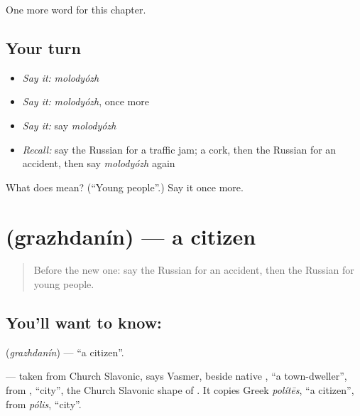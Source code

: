 \begin{grammarlens}[title={What you've built}]
One more word for this chapter.
\end{grammarlens}

\subsection*{Your turn}
\begin{itemize}
\raggedright
  \item \emph{Say it:} \emph{molodyózh}
  \item \emph{Say it:} \emph{molodyózh}, once more
  \item \emph{Say it:} say \emph{molodyózh}
  \item \emph{Recall:} say the Russian for a traffic jam; a cork, then the Russian for an accident, then say \emph{molodyózh} again
\end{itemize}

\begin{tcolorbox}[breakable,colback=teal!4,colframe=teal!35!black,title={Before you move on}]
What does  mean? (\textquotedblleft{}Young people\textquotedblright{}.) Say it once more.
\end{tcolorbox}
\section[\texorpdfstring{\ru{гражданин} (grazhdanín)}{гражданин (grazhdanín)}]{ (grazhdanín) — a citizen}

\label{lesson:RU-C199-grazhdanin}



\begin{quote}
Before the new one: say the Russian for an accident, then the Russian for young people.
\end{quote}

\subsection*{You'll want to know: }
\textbf{} (\emph{grazhdanín}) — \textquotedblleft{}a citizen\textquotedblright{}.

\begin{cousinweb}
\textbf{} — taken from Church Slavonic, says Vasmer, beside native \emph{}, \textquotedblleft{}a town-dweller\textquotedblright{}, from \emph{}, \textquotedblleft{}city\textquotedblright{}, the Church Slavonic shape of \emph{}. It copies Greek \emph{polítēs}, \textquotedblleft{}a citizen\textquotedblright{}, from \emph{pólis}, \textquotedblleft{}city\textquotedblright{}.
\end{cousinweb}

